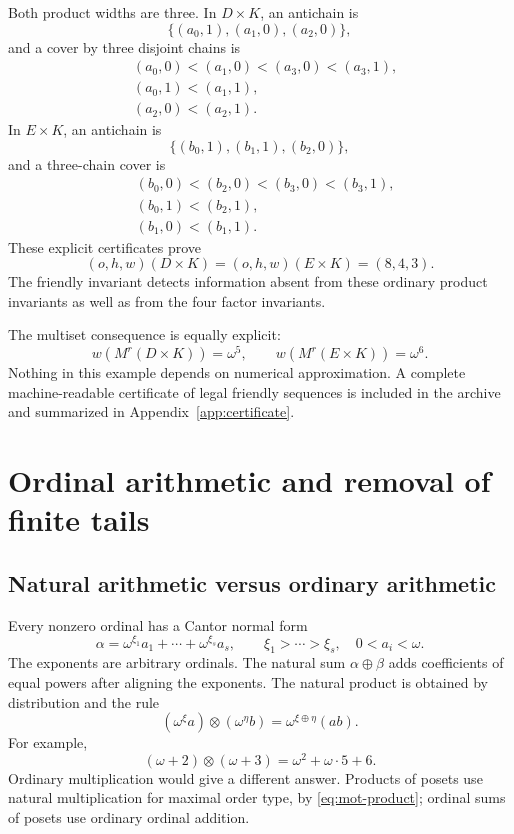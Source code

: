\documentclass[11pt,letterpaper]{article}
\theoremstyle{definition}
\theoremstyle{remark}
\begin{document}
Both product widths are three. In $D\times K$, an antichain is
\[
 \{(a_0,1),(a_1,0),(a_2,0)\},
\]
and a cover by three disjoint chains is
\[
\begin{aligned}
 &(a_0,0)<(a_1,0)<(a_3,0)<(a_3,1),\\
 &(a_0,1)<(a_1,1),\\
 &(a_2,0)<(a_2,1).
\end{aligned}
\]
In $E\times K$, an antichain is
\[
 \{(b_0,1),(b_1,1),(b_2,0)\},
\]
and a three-chain cover is
\[
\begin{aligned}
 &(b_0,0)<(b_2,0)<(b_3,0)<(b_3,1),\\
 &(b_0,1)<(b_2,1),\\
 &(b_1,0)<(b_1,1).
\end{aligned}
\]
These explicit certificates prove
\[
 (o,h,w)(D\times K)=(o,h,w)(E\times K)=(8,4,3).
\]
The friendly invariant detects information absent from these ordinary
product invariants as well as from the four factor invariants.

The multiset consequence is equally explicit:
\[
 w(M^r(D\times K))=\omega^5,
 \qquad
 w(M^r(E\times K))=\omega^6.
\]
Nothing in this example depends on numerical approximation. A complete
machine-readable certificate of legal friendly sequences is included in
the archive and summarized in Appendix~\ref{app:certificate}.

\section{Ordinal arithmetic and removal of finite tails}\label{sec:tails}

\subsection{Natural arithmetic versus ordinary arithmetic}
Every nonzero ordinal has a Cantor normal form
\[
 \alpha=\omega^{\xi_1}a_1+\cdots+\omega^{\xi_s}a_s,
 \qquad \xi_1>\cdots>\xi_s,\quad 0<a_i<\omega.
\]
The exponents are arbitrary ordinals. The natural sum $\alpha\oplus\beta$
adds coefficients of equal powers after aligning the exponents. The
natural product is obtained by distribution and the rule
\[
 (\omega^\xi a)\otimes(\omega^\eta b)
 =\omega^{\xi\oplus\eta}(ab).
\]
For example,
\begin{equation}\label{eq:cnf-example}
 (\omega+2)\otimes(\omega+3)=\omega^2+\omega\cdot5+6.
\end{equation}
Ordinary multiplication would give a different answer. Products of posets
use natural multiplication for maximal order type, by
\eqref{eq:mot-product}; ordinal sums of posets use ordinary ordinal
addition.
\end{document}
